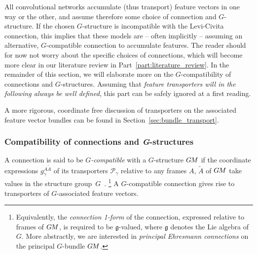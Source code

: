 All convolutional networks accumulate (thus transport) feature vectors in one way or the other, and assume therefore some choice of connection and $G$-structure.
If the chosen $G$-structure is incompatible with the Levi-Civita connection, this implies that these models are -- often implicitly -- assuming an alternative, $G$-compatible connection to accumulate features.
The reader should for now not worry about the specific choices of connections, which will become more clear in our literature review in Part~\ref{part:literature_review}.
In the remainder of this section, we will elaborate more on the $G$-compatibility of connections and $G$-structures.
Assuming that \emph{feature transporters will in the following always be well defined}, this part can be safely ignored at a first reading.

A more rigorous, coordinate free discussion of transporters on the associated feature vector bundles can be found in Section~\ref{sec:bundle_transport}.






\subsubsection{Compatibility of connections and \textit{G}-structures}

A connection is said to be \emph{$G$-compatible} with a $G$-structure $G\mkern-1.4muM$ if the coordinate expressions $g_\gamma^{A\widetilde{A}}$ of its transporters $\mathcal{P}_\gamma$ relative to any frames $A$, $\widetilde{A}$ of $G\mkern-1.4muM$ take values in the structure group~$G$~\cite{wendlLectureNotesBundles2008}.%
\footnote{
    Equivalently, the \emph{connection 1-form} of the connection, expressed relative to frames of $G\mkern-1.4muM$, is required to be $\mathfrak{g}$-valued, where $\mathfrak{g}$ denotes the Lie algebra of~$G$.
    More abstractly, we are interested in \emph{principal Ehresmann connections} on the principal $G$-bundle $G\mkern-1.4muM$.
}
A $G$-compatible connection gives rise to transporters of $G$-associated feature vectors.

